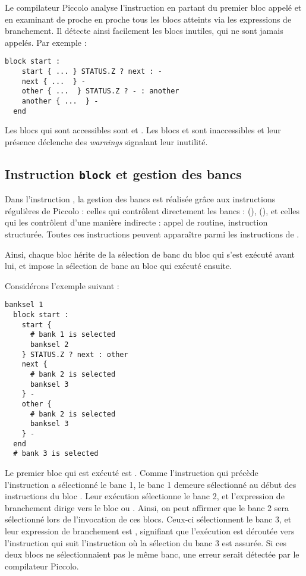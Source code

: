 Le compilateur Piccolo analyse l'instruction  en partant du premier bloc appelé et en examinant de proche en proche tous les blocs atteints via les expressions de branchement. Il détecte ainsi facilement les blocs inutiles, qui ne sont jamais appelés. Par exemple :

\begin{lstlisting}[language=piccolo]
  block start :
    start { ... } STATUS.Z ? next : -
    next { ...  } -
    other { ...  } STATUS.Z ? - : another
    another { ...  } -
  end
\end{lstlisting}

Les blocs qui sont accessibles sont  et . Les blocs  et  sont inaccessibles et leur présence déclenche des \emph{warnings} signalant leur inutilité.








\subsection{Instruction \texttt{block} et gestion des bancs}

Dans l'instruction , la gestion des bancs est réalisée grâce aux instructions régulières de Piccolo : celles qui contrôlent directement les bancs :  (),  (), et celles qui les contrôlent d'une manière indirecte : appel de routine, instruction structurée. Toutes ces instructions peuvent apparaître parmi les instructions de .

Ainsi, chaque bloc hérite de la sélection de banc du bloc qui s'est exécuté avant lui, et impose la sélection de banc au bloc qui exécuté ensuite.

Considérons l'exemple suivant :

\begin{lstlisting}[language=piccolo]
  banksel 1
  block start :
    start {
      # bank 1 is selected
      banksel 2
    } STATUS.Z ? next : other
    next {
      # bank 2 is selected
      banksel 3
    } -
    other {
      # bank 2 is selected
      banksel 3
    } -
  end
  # bank 3 is selected
\end{lstlisting}

Le premier bloc qui est exécuté est . Comme l'instruction qui précède l'instruction  a sélectionné le banc 1, le banc 1 demeure sélectionné au début des instructions du bloc . Leur exécution sélectionne le banc 2, et l'expression de branchement dirige vers le bloc  ou . Ainsi, on peut affirmer que le banc 2 sera sélectionné lors de l'invocation de ces blocs. Ceux-ci sélectionnent le banc 3, et leur expression de branchement est \piccolo{-}, signifiant que l'exécution est déroutée vers l'instruction qui suit l'instruction  où la sélection du banc 3 est assurée. Si ces deux blocs ne sélectionnaient pas le même banc, une erreur serait détectée par le compilateur Piccolo.

